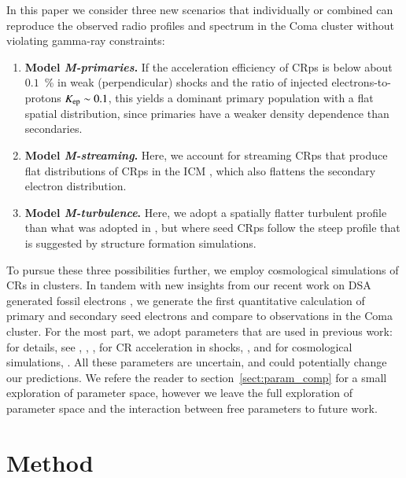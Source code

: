 \documentclass[a4paper,fleqn,usenatbib]{mnras}
\begin{document}
In this paper we consider three new scenarios that
individually or combined can reproduce the observed radio profiles and
spectrum in the Coma cluster without violating gamma-ray constraints:
\begin{enumerate}
\item {\bf Model {\em M-primaries}.} If the acceleration efficiency of CRps is below
  about $0.1$~{\%} in weak (perpendicular) shocks and the ratio of injected
  electrons-to-protons $K_{{\mathrm{ep}}} \sim 0.1$, this yields a dominant primary
  population with a flat spatial distribution, since primaries have a weaker
  density dependence than secondaries.
\item {\bf Model {\em M-streaming}.} Here, we account for streaming CRps that
  produce flat distributions of CRps in the ICM
  \citep{ensslin11,wiener13,2014MNRAS.438..124Z}, which also flattens the
  secondary electron distribution.
\item {\bf Model {\em M-turbulence}.} Here, we adopt a spatially
  flatter turbulent profile than what was adopted in \citet{brunetti12},
  but where seed CRps follow the steep profile that is suggested by
  structure formation simulations.
\end{enumerate}

To pursue these three possibilities further, we employ cosmological
simulations of CRs in clusters. In tandem with new insights from our
recent work on DSA generated fossil electrons \citep{pinzke13}, we
generate the first quantitative calculation of primary and secondary
seed electrons and compare to observations in the Coma cluster. For
the most part, we adopt parameters that are used in previous work: for
details, see \citep[][ turbulent spectrum]{brunetti07,brunetti11},
\citep[][ injection scale of turbulens]{2015ApJ...800...60M},
\citep[][ energy density of
  turbulence]{2009ApJ...705.1129L,2010ApJ...725.1452S,2011A&A...529A..17V},
for CR acceleration in shocks, \citep[][ in particular $K_{\rmn{ep}}$,
  acceleration efficiency]{pinzke13}, and for cosmological
simulations, \citep[][ i.e., shock history, temperature profile,
  density profile, magnetic field profile]{pinzke10}. All these
parameters are uncertain, and could potentially change our
predictions. We refere the reader to section~\ref{sect:param_comp} for
a small exploration of parameter space, however we leave the full
exploration of parameter space and the interaction between free
parameters to future work.


\section{Method} 
\end{document}
